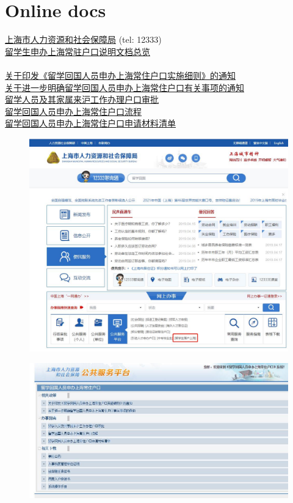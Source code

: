 \documentclass[a4paper,12pt]{book}
\begin{document}
\def\myline {\rule{\textwidth}{1pt}}
\setcounter{secnumdepth}{3}

\section*{Online docs}
\href{http://rsj.sh.gov.cn/201712333/index.shtml}{上海市人力资源和社会保障局}  (tel: 12333) \\
\href{http://lxrylh.12333sh.gov.cn/lxssb/default_view.jsp#view2}{留学生申办上海常驻户口说明文档总览}\\
\\
\href{http://files.shafea.sh.gov.cn/html/2053b6c9-824f-45cb-8c6a-8fe743f73dfe.htm}{关于印发《留学回国人员申办上海常住户口实施细则》的通知}\\
\href{http://files.shafea.gov.cn/html/1d13ad3b-4df6-466a-a3b3-5c2070327905.htm}{关于进一步明确留学回国人员申办上海常住户口有关事项的通知}\\
\href{http://files.shafea.gov.cn/html/265deb86-f689-480c-a570-22d4630d1337.htm}{留学人员及其家属来沪工作办理户口审批}\\
\href{http://files.shafea.sh.gov.cn/html/3bb6144a-291d-4b8a-bcb5-5c4e2f87e0e0.htm}{留学回国人员申办上海常住户口流程}\\
\href{http://files.shafea.sh.gov.cn/html/11efc15c-b733-4341-a655-511075b7093c.htm}{留学回国人员申办上海常住户口申请材料清单}
\begin{figure}[htbp]
\centering
\includegraphics[width=0.7\linewidth]{fig1.jpg}
\end{figure}
\begin{figure}[htbp]
\centering
\includegraphics[width=0.8\linewidth]{fig2.jpg}
\end{figure}
\end{document}
